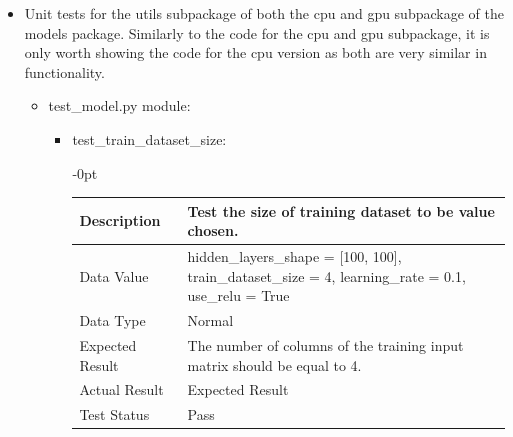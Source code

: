 \documentclass[./project-report/src/latex/project-report.tex]{subfiles}
\begin{document}
\begin{itemize}
    \label{sec:models-utils-unit-tests}
    \item Unit tests for the utils subpackage of both the cpu and gpu subpackage of the models package. Similarly to the code for the cpu and gpu subpackage, it is 
          only worth showing the code for the cpu version as both are very similar in functionality.
        \begin{itemize}
            \item test\_model.py module:
				\begin{itemize}
					\item test\_train\_dataset\_size: \newline
					\begin{adjustwidth}{-\leftmargin}{0pt}
					\begin{tabular}{|p{0.25\linewidth}|p{0.75\linewidth}|}
						\hline
						Description & Test the size of training dataset to be value chosen. \\
						\hline	
						Data Value & hidden\_layers\_shape = [100, 100], \newline
								train\_dataset\_size = 4, \newline
								learning\_rate = 0.1, \newline
								use\_relu = True \\
						\hline
						Data Type & Normal \\
						\hline
						Expected Result & The number of columns of the training input matrix should be equal to 4. \\
						\hline
						Actual Result & Expected Result \\
						\hline
						Test Status & Pass \\
						\hline
					\end{tabular}
					\end{adjustwidth}
					
					\vspace{5mm}
					

\end{itemize}
\end{itemize}
\end{itemize}
\end{document}
